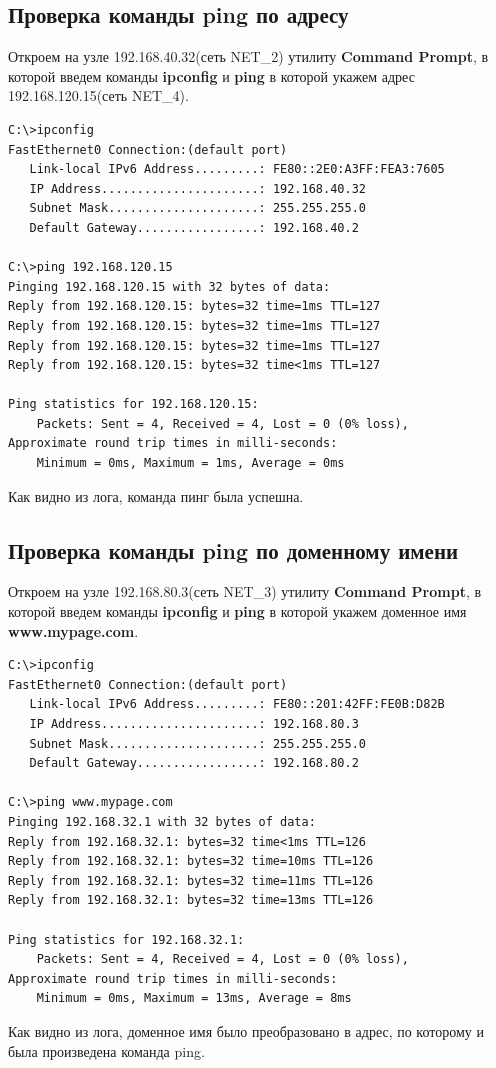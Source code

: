 \documentclass[a4paper, 12pt]{article}		%
\begin{document}
\subsection{Проверка команды ping по адресу}
Откроем на узле 192.168.40.32(сеть NET\_2) утилиту \textbf{Command Prompt}, в которой введем команды \textbf{ipconfig} и \textbf{ping} в которой укажем адрес 192.168.120.15(сеть NET\_4).
\begin{lstlisting}[language={}]
C:\>ipconfig
FastEthernet0 Connection:(default port)
   Link-local IPv6 Address.........: FE80::2E0:A3FF:FEA3:7605
   IP Address......................: 192.168.40.32
   Subnet Mask.....................: 255.255.255.0
   Default Gateway.................: 192.168.40.2

C:\>ping 192.168.120.15
Pinging 192.168.120.15 with 32 bytes of data:
Reply from 192.168.120.15: bytes=32 time=1ms TTL=127
Reply from 192.168.120.15: bytes=32 time=1ms TTL=127
Reply from 192.168.120.15: bytes=32 time=1ms TTL=127
Reply from 192.168.120.15: bytes=32 time<1ms TTL=127

Ping statistics for 192.168.120.15:
    Packets: Sent = 4, Received = 4, Lost = 0 (0% loss),
Approximate round trip times in milli-seconds:
    Minimum = 0ms, Maximum = 1ms, Average = 0ms
\end{lstlisting}
Как видно из лога, команда пинг была успешна.

\subsection{Проверка команды ping по доменному имени}
Откроем на узле 192.168.80.3(сеть NET\_3) утилиту \textbf{Command Prompt}, в которой введем команды \textbf{ipconfig} и \textbf{ping} в которой укажем доменное имя \textbf{www.mypage.com}.
\begin{lstlisting}[language={}]
C:\>ipconfig
FastEthernet0 Connection:(default port)
   Link-local IPv6 Address.........: FE80::201:42FF:FE0B:D82B
   IP Address......................: 192.168.80.3
   Subnet Mask.....................: 255.255.255.0
   Default Gateway.................: 192.168.80.2

C:\>ping www.mypage.com
Pinging 192.168.32.1 with 32 bytes of data:
Reply from 192.168.32.1: bytes=32 time<1ms TTL=126
Reply from 192.168.32.1: bytes=32 time=10ms TTL=126
Reply from 192.168.32.1: bytes=32 time=11ms TTL=126
Reply from 192.168.32.1: bytes=32 time=13ms TTL=126

Ping statistics for 192.168.32.1:
    Packets: Sent = 4, Received = 4, Lost = 0 (0% loss),
Approximate round trip times in milli-seconds:
    Minimum = 0ms, Maximum = 13ms, Average = 8ms
\end{lstlisting}
Как видно из лога, доменное имя было преобразовано в адрес, по которому и была произведена команда ping.
\end{document}
